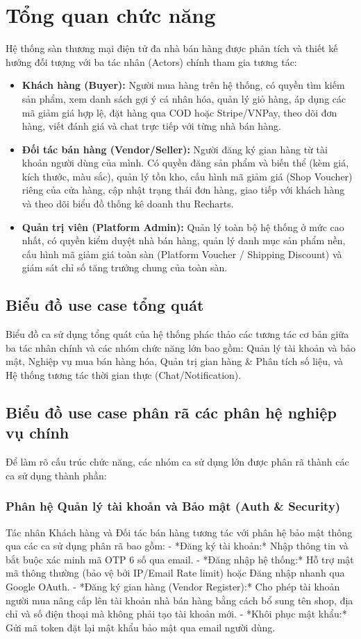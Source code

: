 \documentclass[../DoAn.tex]{subfiles}
\begin{document}
\section{Tổng quan chức năng}
\label{section:2.2}
Hệ thống sàn thương mại điện tử đa nhà bán hàng được phân tích và thiết kế hướng đối tượng với ba tác nhân (Actors) chính tham gia tương tác:
\begin{itemize}
\item \textbf{Khách hàng (Buyer):} Người mua hàng trên hệ thống, có quyền tìm kiếm sản phẩm, xem danh sách gợi ý cá nhân hóa, quản lý giỏ hàng, áp dụng các mã giảm giá hợp lệ, đặt hàng qua COD hoặc Stripe/VNPay, theo dõi đơn hàng, viết đánh giá và chat trực tiếp với từng nhà bán hàng.
\item \textbf{Đối tác bán hàng (Vendor/Seller):} Người đăng ký gian hàng từ tài khoản người dùng của mình. Có quyền đăng sản phẩm và biến thể (kèm giá, kích thước, màu sắc), quản lý tồn kho, cấu hình mã giảm giá (Shop Voucher) riêng của cửa hàng, cập nhật trạng thái đơn hàng, giao tiếp với khách hàng và theo dõi biểu đồ thống kê doanh thu Recharts.
\item \textbf{Quản trị viên (Platform Admin):} Quản lý toàn bộ hệ thống ở mức cao nhất, có quyền kiểm duyệt nhà bán hàng, quản lý danh mục sản phẩm nền, cấu hình mã giảm giá toàn sàn (Platform Voucher / Shipping Discount) và giám sát chỉ số tăng trưởng chung của toàn sàn.
\end{itemize}

\subsection{Biểu đồ use case tổng quát}
\label{subsection:2.2.1}
Biểu đồ ca sử dụng tổng quát của hệ thống phác thảo các tương tác cơ bản giữa ba tác nhân chính và các nhóm chức năng lớn bao gồm: Quản lý tài khoản và bảo mật, Nghiệp vụ mua bán hàng hóa, Quản trị gian hàng & Phân tích số liệu, và Hệ thống tương tác thời gian thực (Chat/Notification).

\subsection{Biểu đồ use case phân rã các phân hệ nghiệp vụ chính}
\label{subsection:2.2.2}
Để làm rõ cấu trúc chức năng, các nhóm ca sử dụng lớn được phân rã thành các ca sử dụng thành phần:

\subsubsection{Phân hệ Quản lý tài khoản và Bảo mật (Auth & Security)}
Tác nhân Khách hàng và Đối tác bán hàng tương tác với phân hệ bảo mật thông qua các ca sử dụng phân rã bao gồm:
- *Đăng ký tài khoản:* Nhập thông tin và bắt buộc xác minh mã OTP 6 số qua email.
- *Đăng nhập hệ thống:* Hỗ trợ mật mã thông thường (bảo vệ bởi IP/Email Rate limit) hoặc Đăng nhập nhanh qua Google OAuth.
- *Đăng ký gian hàng (Vendor Register):* Cho phép tài khoản người mua nâng cấp lên tài khoản nhà bán hàng bằng cách bổ sung tên shop, địa chỉ và số điện thoại mà không phải tạo tài khoản mới.
- *Khôi phục mật khẩu:* Gửi mã token đặt lại mật khẩu bảo mật qua email người dùng.
\end{document}
